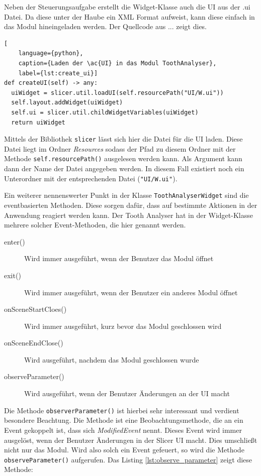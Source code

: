 Neben der Steuerungsaufgabe erstellt die Widget-Klasse auch die UI aus der .ui
Datei. Da diese unter der Haube ein XML Format aufweist, kann diese einfach in
das Modul hineingeladen werden. Der Quellcode aus ... zeigt dies.

\begin{lstlisting}[
    language={python},
    caption={Laden der \ac{UI} in das Modul ToothAnalyser},
    label={lst:create_ui}]
def createUI(self) -> any:
  uiWidget = slicer.util.loadUI(self.resourcePath("UI/W.ui"))
  self.layout.addWidget(uiWidget)
  self.ui = slicer.util.childWidgetVariables(uiWidget)
  return uiWidget
\end{lstlisting}

Mittels der Bibliothek \texttt{slicer} lässt sich hier die Datei für die \ac{UI}
laden. Diese Datei liegt im Ordner \textit{Resources} sodass der Pfad zu diesem
Ordner mit der Methode \texttt{self.resourcePath()} ausgelesen werden kann. Als
Argument kann dann der Name der Datei angegeben werden. In diesem Fall existiert
noch ein Unterordner mit der entsprechenden Datei (\texttt{"UI/W.ui"}).

Ein weiterer nennenswerter Punkt in der Klasse \texttt{ToothAnalyserWidget} sind
die eventbasierten Methoden. Diese sorgen dafür, dass auf bestimmte Aktionen in der
Anwendung reagiert werden kann. Der Tooth Analyser hat in der Widget-Klasse
mehrere solcher Event-Methoden, die hier genannt werden.

\begin{description}
	\item[enter()] Wird immer ausgeführt, wenn der Benutzer das Modul öffnet

	\item[exit()] Wird immer ausgeführt, wenn der Benutzer ein anderes Modul
		öffnet

	\item[onSceneStartCloes()] Wird immer ausgeführt, kurz bevor das Modul
		geschlossen wird

	\item[onSceneEndClose()] Wird ausgeführt, nachdem das Modul geschlossen wurde

	\item[observeParameter()] Wird ausgeführt, wenn der Benutzer Änderungen an der
		\ac{UI} macht
\end{description}

Die Methode \texttt{observerParameter()} ist hierbei sehr interessant und verdient
besondere Beachtung. Die Methode ist eine Beobachtungsmethode, die an ein Event gekoppelt
ist, dass sich \textit{ModifiedEvent} nennt. Dieses Event wird immer ausgelöst, wenn
der Benutzer Änderungen in der Slicer \ac{UI} macht. Dies umschließt nicht nur das
Modul. Wird also solch ein Event gefeuert, so wird die Methode \texttt{observeParameter()}
aufgerufen. Das Listing \ref{lst:observe_parameter} zeigt diese Methode:

